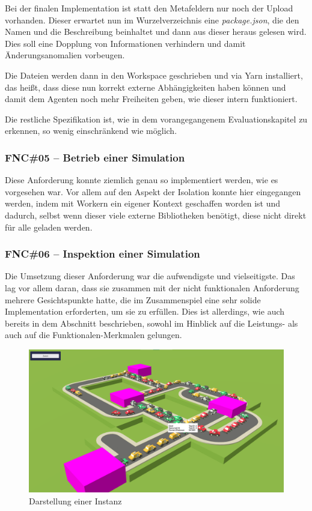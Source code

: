 Bei der finalen Implementation ist statt den Metafeldern nur noch der Upload vorhanden.
Dieser erwartet nun im Wurzelverzeichnis eine \textit{package.json}, die den Namen und die Beschreibung beinhaltet und dann aus dieser heraus gelesen wird.
Dies soll eine Dopplung von Informationen verhindern und damit Änderungsanomalien vorbeugen.

Die Dateien werden dann in den Workspace geschrieben und via Yarn installiert, das heißt, dass diese nun korrekt externe Abhängigkeiten haben können und damit dem Agenten noch mehr Freiheiten geben, wie dieser intern funktioniert.

Die restliche Spezifikation ist, wie in dem vorangegangenem Evaluationskapitel zu erkennen, so wenig einschränkend wie möglich.

\subsubsection{FNC\#05 – Betrieb einer Simulation}

Diese Anforderung konnte ziemlich genau so implementiert werden, wie es vorgesehen war.
Vor allem auf den Aspekt der Isolation konnte hier eingegangen werden, indem mit Workern ein eigener Kontext geschaffen worden ist und dadurch, selbst wenn dieser viele externe Bibliotheken benötigt, diese nicht direkt für alle geladen werden.

\subsubsection{FNC\#06 – Inspektion einer Simulation}

Die Umsetzung dieser Anforderung war die aufwendigste und vielseitigste.
Das lag vor allem daran, dass sie zusammen mit der nicht funktionalen Anforderung  mehrere Gesichtspunkte hatte, die im Zusammenspiel eine sehr solide Implementation erforderten, um sie zu erfüllen.
Dies ist allerdings, wie auch bereits in dem Abschnitt  beschrieben, sowohl im Hinblick auf die Leistungs- als auch auf die Funktionalen-Merkmalen gelungen.

\begin{figure}[htb]
    \centering
    \includegraphics[scale=.25,center]{medien/screenshots/instance-view.png}
    \caption{Darstellung einer Instanz}
    \ownsource
    \label{fig:instance-view}
\end{figure}

